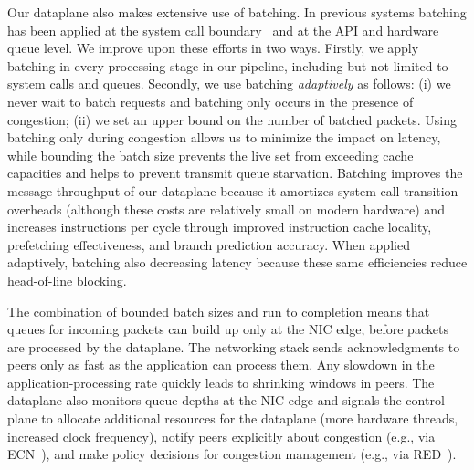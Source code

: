 Our dataplane also makes extensive use of batching.
In previous systems batching has been applied at the system call
boundary~\cite{DBLP:conf/osdi/HanMCR12, DBLP:conf/osdi/SoaresS10} and
at the API and hardware queue level\cite{jeong2014mtcp}.
We improve upon these efforts in two ways. Firstly, we apply
batching in every processing stage in our pipeline, including but not limited to
system calls and queues. Secondly, we use batching \emph{adaptively} as follows:
(i) we never wait to batch requests and batching
only occurs in the presence of congestion; (ii) we set an upper bound on
the number of batched packets. Using batching only during congestion allows
us to minimize the impact on latency, while bounding the batch size prevents
the live set from exceeding cache capacities and helps to prevent
transmit queue starvation. Batching improves the message throughput of our
dataplane because it amortizes system call transition overheads (although
these costs are relatively small on modern hardware) and increases
instructions per cycle through improved instruction cache locality, prefetching
effectiveness, and branch prediction accuracy. When applied adaptively, batching
also decreasing latency because these same efficiencies reduce head-of-line blocking.

The combination of bounded batch sizes and run to completion means that
queues for incoming packets can build up only at the NIC edge, before
packets are processed by the dataplane.  The networking stack sends
acknowledgments to peers only as fast as the application can process
them. Any slowdown in the application-processing rate quickly leads to
shrinking windows in peers. The dataplane also monitors queue depths
at the NIC edge and signals the control plane to allocate additional
resources for the dataplane (more hardware threads, increased clock
frequency), notify peers explicitly about congestion (e.g., via
ECN~\cite{ramakrishnan2001addition}), and make policy decisions for
congestion management (e.g., via
RED~\cite{DBLP:journals/ton/FloydJ93}).



